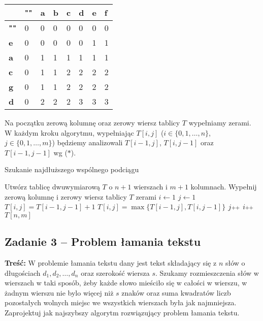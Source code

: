 \begin{table}[H]
	\center
	\begin{tabular}{|l|lllllll|}
		\hline
		& \multicolumn{1}{l|}{\textbf{""}} & \multicolumn{1}{l|}{\textbf{a}} & \multicolumn{1}{l|}{\textbf{b}} & \multicolumn{1}{l|}{\textbf{c}} & \multicolumn{1}{l|}{\textbf{d}} & \multicolumn{1}{l|}{\textbf{e}} & \multicolumn{1}{l|}{\textbf{f}} \\ \hline
		\textbf{""} & 0 & 0 & 0 & 0 & 0 & 0 & 0 \\ \cline{1-1}
		\textbf{e}  & 0 & 0 & 0 & 0 & 0 & 1 & 1 \\ \cline{1-1}
		\textbf{a}  & 0 & 1 & 1 & 1 & 1 & 1 & 1 \\ \cline{1-1}
		\textbf{c}  & 0 & 1 & 1 & 2 & 2 & 2 & 2 \\ \cline{1-1}
		\textbf{g}  & 0 & 1 & 1 & 2 & 2 & 2 & 2 \\ \cline{1-1}
		\textbf{d}  & 0 & 2 & 2 & 2 & 3 & 3 & 3 \\ \cline{1-1}
		\hline
	\end{tabular}
	\caption{}
	\label{tab_zad12}
\end{table}

Na początku zerową kolumnę oraz zerowy wiersz tablicy $T$
wypełniamy zerami. W każdym kroku algorytmu, wypełniając $T[i, j]$
($i \in \{0,1, \dots, n\}$, $j \in \{0,1, \dots, m\}$)
będziemy analizowali $T[i-1, j]$, $T[i, j-1]$ oraz $T[i-1,j-1]$ wg ($\ast$).


\begin{algorithm}[H]
	\caption{Szukanie najdłuższego wspólnego podciągu}\label{Zadanie12}
	\begin{algorithmic}[1]
		\State Utwórz tablicę dwuwymiarową $T$ o $n+1$ wierszach i $m+1$ kolumnach.
		\State Wypełnij zerową kolumnę i zerowy wiersz tablicy $T$ zerami
		\State $i \gets 1$
		\State $j \gets 1$
		\State $T[i, j] = T[i-1,j-1] + 1$
		\Else
		\State $T[i, j] = \max\{T[i-1,j], T[i,j-1]\}$
		\EndIf
		\State $j \pp$
		\EndWhile
		\State $i \pp$
		\EndWhile
		\State \Return $T[n, m]$
		\EndProcedure 
	\end{algorithmic}
\end{algorithm}


\subsection{Zadanie 3 -- Problem łamania tekstu}
\textbf{Treść:} W problemie łamania tekstu dany jest tekst składający się z $n$
słów o długościach $d_1, d_2, \ldots , d_n$ oraz
szerokość wiersza $s$. Szukamy rozmieszczenia słów w wierszach w taki 
sposób, żeby każde słowo mieściło się w całości
w wierszu, w żadnym wierszu nie bylo więcej niż $s$ znaków 
oraz suma kwadratów liczb pozostałych wolnych miejsc we
wszystkich wierszach była jak najmniejsza.
Zaprojektuj jak najszybszy algorytm rozwiązujący problem łamania tekstu.

